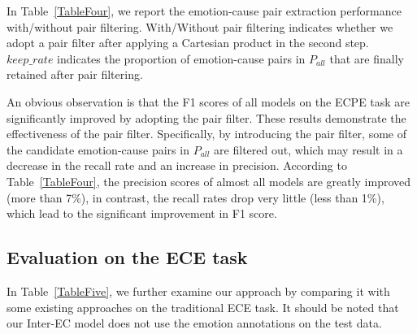 \documentclass[11pt,a4paper]{article}
\begin{document}
In Table~\ref{TableFour}, we report the emotion-cause pair extraction performance with/without pair filtering. With/Without pair filtering indicates whether we adopt a pair filter after applying a Cartesian product in the second step. $keep\_rate$ indicates the proportion of emotion-cause pairs in $ P_{all} $ that are finally retained after pair filtering.

An obvious observation is that the F1 scores of all models on the ECPE task are significantly improved by adopting the pair filter. These results demonstrate the effectiveness of the pair filter. Specifically, by introducing the pair filter, some of the candidate emotion-cause pairs in $ P_{all} $ are filtered out, which may result in a decrease in the recall rate and an increase in precision. According to Table~\ref{TableFour}, the precision scores of almost all models are greatly improved (more than 7\%), in contrast, the recall rates drop very little (less than 1\%), which lead to the significant improvement in F1 score.

\subsection{Evaluation on the ECE task}
In Table~\ref{TableFive}, we further examine our approach by comparing it with some existing approaches on the traditional ECE task. It should be noted that our Inter-EC model does not use the emotion annotations on the test data.
\end{document}
